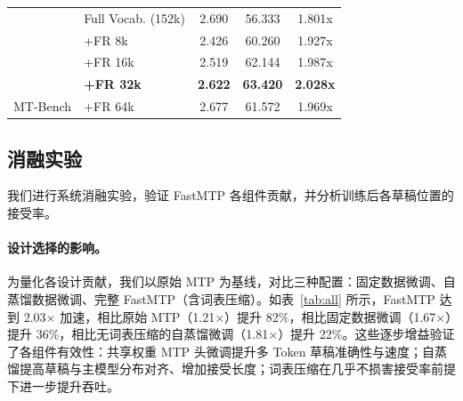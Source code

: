 \documentclass{article} %
\begin{document}
\begin{table}[htbp]
\begin{tabular}{clccc}
                           & Full Vocab. (152k)                    & 2.690                                  & 56.333                                  & 1.801x                                  \\
                           & +FR 8k                                   & 2.426                                  & 60.260                                  & 1.927x                                  \\
                           & +FR 16k                                  & 2.519                                  & 62.144                                  & 1.987x                                  \\
                           & \cellcolor[HTML]{E5F6FF}\textbf{+FR 32k} & \cellcolor[HTML]{E5F6FF}\textbf{2.622} & \cellcolor[HTML]{E5F6FF}\textbf{63.420} & \cellcolor[HTML]{E5F6FF}\textbf{2.028x} \\
\multirow{-6}{*}{MT-Bench} & +FR 64k                                  & 2.677                                  & 61.572                                  & 1.969x     \\ \bottomrule
\end{tabular}
\end{table}

\subsection{消融实验}

我们进行系统消融实验，验证 FastMTP 各组件贡献，并分析训练后各草稿位置的接受率。

\paragraph{设计选择的影响。} 为量化各设计贡献，我们以原始 MTP 为基线，对比三种配置：固定数据微调、自蒸馏数据微调、完整 FastMTP（含词表压缩）。如表~\ref{tab:all} 所示，FastMTP 达到 2.03$\times$ 加速，相比原始 MTP（1.21$\times$）提升 82\%，相比固定数据微调（1.67$\times$）提升 36\%，相比无词表压缩的自蒸馏微调（1.81$\times$）提升 22\%。这些逐步增益验证了各组件有效性：共享权重 MTP 头微调提升多 Token 草稿准确性与速度；自蒸馏提高草稿与主模型分布对齐、增加接受长度；词表压缩在几乎不损害接受率前提下进一步提升吞吐。
\end{document}
